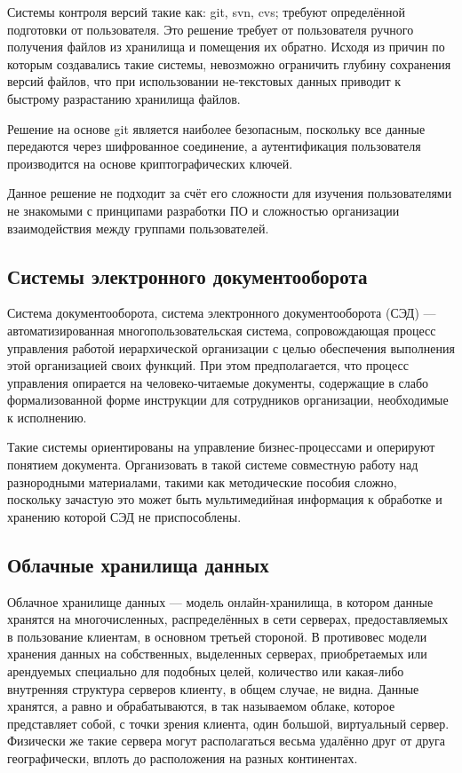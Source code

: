\documentclass[utf8,usehyperref,12pt]{G7-32}
\begin{document}
Системы контроля версий такие как: git, svn, cvs; требуют определённой подготовки от пользователя. Это решение требует от пользователя ручного получения файлов из хранилища и помещения их обратно. Исходя из причин по которым создавались такие системы, невозможно ограничить глубину сохранения версий файлов, что при использовании не-текстовых данных приводит к быстрому разрастанию хранилища файлов.

Решение на основе git является наиболее безопасным, поскольку все данные передаются через шифрованное соединение, а аутентификация пользователя производится на основе криптографических ключей.

Данное решение не подходит за счёт его сложности для изучения пользователями не знакомыми с принципами разработки ПО и сложностью организации взаимодействия между группами пользователей.

\subsection{Системы электронного документооборота}
Система документооборота, система электронного документооборота (СЭД) — автоматизированная многопользовательская система, сопровождающая процесс управления работой иерархической организации с целью обеспечения выполнения этой организацией своих функций. При этом предполагается, что процесс управления опирается на человеко-читаемые документы, содержащие в слабо формализованной форме инструкции для сотрудников организации, необходимые к исполнению.

Такие системы ориентированы на управление бизнес-процессами и оперируют понятием документа. Организовать в такой системе совместную работу над разнородными материалами, такими как методические пособия сложно, поскольку зачастую это может быть мультимедийная информация к обработке и хранению которой СЭД не приспособлены.

\subsection{Облачные хранилища данных}

Облачное хранилище данных — модель онлайн-хранилища, в котором данные хранятся на многочисленных, распределённых в сети серверах, предоставляемых в пользование клиентам, в основном третьей стороной. В противовес модели хранения данных на собственных, выделенных серверах, приобретаемых или арендуемых специально для подобных целей, количество или какая-либо внутренняя структура серверов клиенту, в общем случае, не видна. Данные хранятся, а равно и обрабатываются, в так называемом облаке, которое представляет собой, с точки зрения клиента, один большой, виртуальный сервер. Физически же такие сервера могут располагаться весьма удалённо друг от друга географически, вплоть до расположения на разных континентах.
\end{document}
